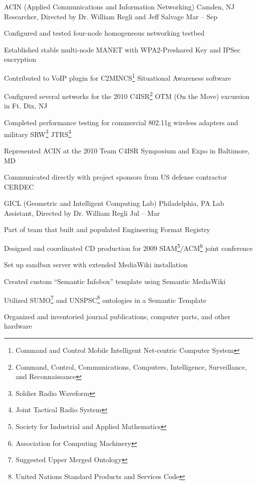 \documentclass[10pt]{barag_resume}
\begin{document}
		\begin{job}{ACIN (Applied Communications and Information Networking)}
			{Camden, NJ}
			{Researcher, Directed by Dr. William Regli and Jeff Salvage}
			{Mar -- Sep }
			\item Configured and tested four-node homogeneous networking testbed
			\item Established stable multi-node MANET with WPA2-Preshared Key and IPSec encryption
			\item Contributed to VoIP plugin for C2MINCS\footnote{Command and Control Mobile Intelligent Net-centric Computer System} Situational Awareness software
			\item Configured several networks for the 2010 C4ISR\footnote{Command, Control, Communications, Computers, Intelligence, Surveillance, and Reconnaissance} OTM (On the Move) excursion in Ft. Dix, NJ
			\item Completed performance testing for commercial 802.11g wireless adapters and military SRW\footnote{Soldier Radio Waveform} JTRS\footnote{Joint Tactical Radio System}
			\item Represented ACIN at the 2010 Team C4ISR Symposium and Expo in Baltimore, MD
			\item Communicated directly with project sponsors from US defense contractor CERDEC
		\end{job}

		\begin{job}{GICL (Geometric and Intelligent Computing Lab)}
			{Philadelphia, PA}
			{Lab Assistant, Directed by Dr. William Regli}
			{Jul  -- Mar }
			\item Part of team that built and populated Engineering Format Registry
			\item Designed and coordinated CD production for 2009 SIAM\footnote{Society for Industrial and Applied Mathematics}/ACM\footnote{Association for Computing Machinery} joint conference
			\item Set up sandbox server with extended MediaWiki installation
			\item Created custom ``Semantic Infobox'' template using Semantic MediaWiki
			\item Utilized SUMO\footnote{Suggested Upper Merged Ontology} and UNSPSC\footnote{United Nations Standard Products and Services Code} ontologies in a Semantic Template
			\item Organized and inventoried journal publications, computer parts, and other hardware
		\end{job}
\end{document}
